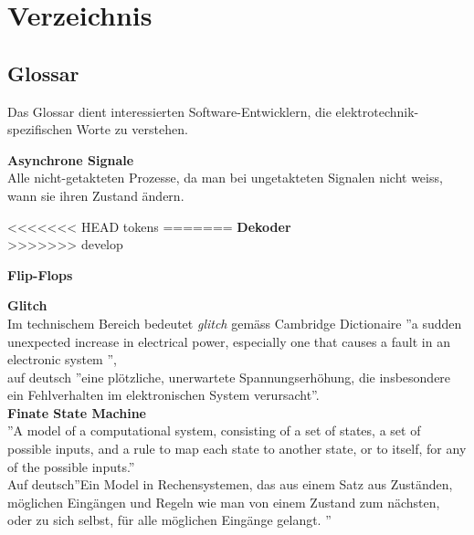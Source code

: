 
\chapter{Verzeichnis}\label{chap.verzeichnis}



\makeatletter
\renewcommand*\bib@heading{ \section{\refname}}
\makeatother



 


\section{Glossar}\label{sect.verzeichnis_glossar}
Das Glossar dient interessierten Software-Entwicklern, die elektrotechnik-spezifischen Worte zu verstehen.

\textbf{Asynchrone Signale}\\
Alle nicht-getakteten Prozesse, da man bei ungetakteten Signalen nicht weiss, wann sie ihren Zustand ändern.

<<<<<<< HEAD
tokens
=======
\textbf{Dekoder}\\
>>>>>>> develop

\textbf{Flip-Flops}

\textbf{Glitch}\\
Im technischem Bereich bedeutet \textit{glitch} gemäss Cambridge Dictionaire ''a sudden unexpected increase in electrical power, especially one that causes a fault in an electronic system ''\cite{dictionair},\\
auf deutsch ''eine plötzliche, unerwartete Spannungserhöhung, die insbesondere ein Fehlverhalten im elektronischen System verursacht''.\\


\textbf{Finate State Machine}\\
''A model of a computational system, consisting of a set of states, a set of possible inputs, and a rule to map each state to another state, or to itself, for any of the possible inputs.''\cite{fsm}\\
Auf deutsch''Ein Model in Rechensystemen, das aus einem Satz aus Zuständen, möglichen Eingängen und Regeln wie man von einem Zustand zum nächsten, oder zu sich selbst, für alle möglichen Eingänge gelangt. ''\\


